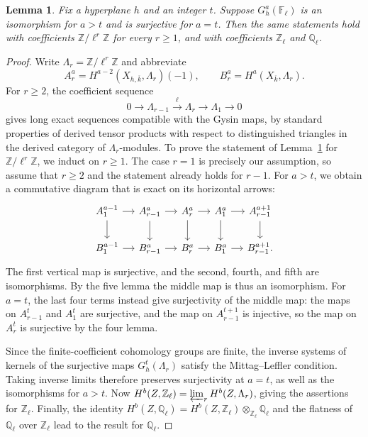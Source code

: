 \documentclass[a4paper,11pt, twoside,reqno]{amsart}
\theoremstyle{plain}
\newtheorem{lemma}[thm]{Lemma}
\theoremstyle{definition}
\theoremstyle{remark}
\newcommand{\ZZ}{\mathbb{Z}}
\newcommand{\QQ}{\mathbb{Q}}
\renewcommand{\bar}{\overline}
\renewcommand{\ge}{\geqslant}
\renewcommand{\geq}{\geqslant}
\newcommand{\FF}{\mathbb{F}}
\numberwithin{equation}{section}
\begin{document}
\begin{lemma}
\label{app:ss:lem:coefficients}
Fix a hyperplane $h$ and an integer $t$. Suppose $G_h^a(\FF_\ell)$ is
an isomorphism for $a>t$ and is surjective for $a=t$. Then the same
statements hold with coefficients $\ZZ/\ell^r\ZZ$ for every $r\geq1$,
and with coefficients $\ZZ_\ell$ and $\QQ_\ell$.
\end{lemma}
\begin{proof}
Write $\Lambda_r=\ZZ/\ell^r\ZZ$ and abbreviate
\[
 A_r^a=H^{a-2}(X_{h,\bar k},\Lambda_r)(-1),\qquad
 B_r^a=H^a(X_{\bar k},\Lambda_r).
\]
For $r\geq2$, the coefficient sequence
\[
 0\longrightarrow\Lambda_{r-1}\xrightarrow{\ell}\Lambda_r
       \longrightarrow\Lambda_1\longrightarrow0
\]
gives long exact sequences compatible with the Gysin maps,
by standard properties of derived tensor products with respect to distinguished triangles
in the derived category of $\Lambda_r$-modules.
To prove the statement of Lemma~\ref{app:ss:lem:coefficients} for $\ZZ/\ell^r\ZZ$,
we induct on $r\ge 1$.
The case $r=1$ is precisely our assumption,
so assume that $r\ge 2$ and the statement already holds for $r-1$.
For $a>t$, we obtain a commutative diagram that is exact on its horizontal arrows:
\[
\begin{tikzcd}[column sep=small]
 A_1^{a-1}\arrow[r]\arrow[d]
 & A_{r-1}^{a}\arrow[r]\arrow[d]
 & A_r^a\arrow[r]\arrow[d]
 & A_1^a\arrow[r]\arrow[d]
 & A_{r-1}^{a+1}\arrow[d]\\
 B_1^{a-1}\arrow[r]
 & B_{r-1}^{a}\arrow[r]
 & B_r^a\arrow[r]
 & B_1^a\arrow[r]
 & B_{r-1}^{a+1}.
\end{tikzcd}
\]
The first vertical map is surjective, and the second, fourth, and
fifth are isomorphisms. By the five lemma the middle map is thus an
isomorphism.
For $a=t$, the last four terms instead give surjectivity
of the middle map:
the maps on $A_{r-1}^t$ and $A_1^t$ are surjective,
and the map on $A_{r-1}^{t+1}$ is injective,
so the map on $A_r^t$ is surjective by the four lemma.

Since the finite-coefficient cohomology groups are finite, the inverse
systems of kernels of the surjective maps $G_h^t(\Lambda_r)$ satisfy
the Mittag--Leffler condition. Taking inverse limits therefore preserves
surjectivity at $a=t$, as well as the isomorphisms for $a>t$.
Now $H^b(Z,\ZZ_\ell)=\varprojlim_r H^b(Z,\Lambda_r)$,
giving the assertions for $\ZZ_\ell$.
Finally, the identity
$H^b(Z,\QQ_\ell)=H^b(Z,\ZZ_\ell)\otimes_{\ZZ_\ell}\QQ_\ell$
and the flatness of $\QQ_\ell$ over $\ZZ_\ell$
lead to the result for $\QQ_\ell$.
\end{proof}
\end{document}
